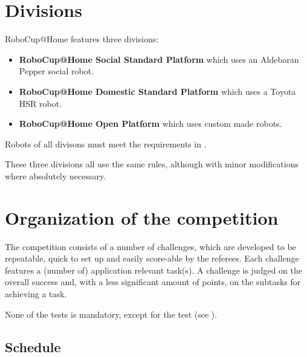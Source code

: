 \section{Divisions}
RoboCup@Home features three divisions:
\begin{itemize}
 \item \textbf{RoboCup@Home Social Standard Platform} which uses an Aldebaran Pepper social robot.
 \item \textbf{RoboCup@Home Domestic Standard Platform} which uses a Toyota HSR robot.
 \item \textbf{RoboCup@Home Open Platform} which uses custom made robots. 
\end{itemize}
Robots of all divisons must meet the requirements in . 

These three divisions all use the same rules, although with minor modifications where absolutely necessary. 

\section{Organization of the competition}
\label{sec:procedure_during_competition}

The competition consists of a number of challenges, which are developed to be repeatable, quick to set up and easily score-able by the referees. 
Each challenge features a (number of) application relevant task(s). 
A challenge is judged on the overall success and, with a less significant amount of points, on the subtasks for achieving a task. 

None of the tests is mandatory, except for the  test (see ).

\subsection{Schedule}
\label{rule:schedule}

